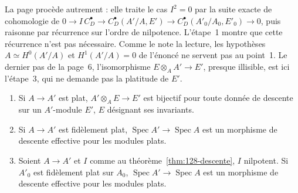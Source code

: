 \begin{remarque}
La page procède autrement : elle traite le cas $I^2 = 0$ par la suite exacte de cohomologie de $0 \to I\,C^\bullet_D \to C^\bullet_D(A'/A, E') \to C^\bullet_D(A'_0/A_0, E'_0) \to 0$, puis raisonne par récurrence sur l'ordre de nilpotence. L'étape~1 montre que cette récurrence n'est pas nécessaire. Comme le note la lecture, les hypothèses $A \simeq H^0(A'/A)$ et $H^1(A'/A) = 0$ de l'énoncé ne servent pas au point~1. Le dernier pas de la page~6, l'isomorphisme $E \otimes_A A' \to E'$, presque illisible, est ici l'étape~3, qui ne demande pas la platitude de $E'$.
\end{remarque}

\begin{encadre}
\begin{theoreme}\label{thm:128-fid-plat}\leavevmode
\begin{enumerate}
\item Si $A \to A'$ est plat, $A' \otimes_A E \to E'$ est bijectif pour toute donnée de descente sur un $A'$-module $E'$, $E$ désignant ses invariants.
\item Si $A \to A'$ est fidèlement plat, $\operatorname{Spec} A' \to \operatorname{Spec} A$ est un morphisme de descente effective pour les modules plats.
\item Soient $A \to A'$ et $I$ comme au théorème~\ref{thm:128-descente}, $I$ nilpotent. Si $A'_0$ est fidèlement plat sur $A_0$, $\operatorname{Spec} A' \to \operatorname{Spec} A$ est un morphisme de descente effective pour les modules plats.
\end{enumerate}
\end{theoreme}
\end{encadre}

